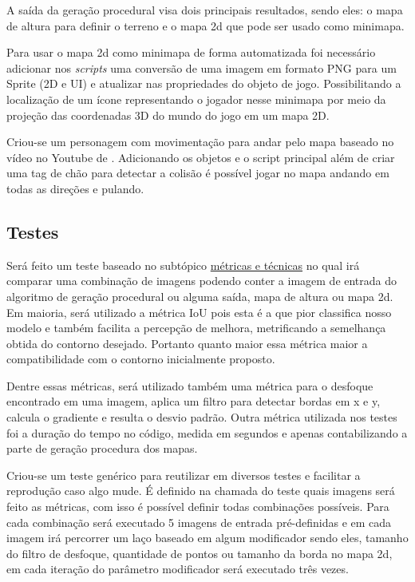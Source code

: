 A saída da geração procedural visa dois principais resultados, sendo eles: o mapa de altura para definir o terreno e o mapa 2d que pode ser usado como minimapa.

Para usar o mapa 2d como minimapa de forma automatizada foi necessário adicionar nos \textit{scripts} uma conversão de uma imagem em formato PNG para um Sprite (2D e UI) e atualizar nas propriedades do objeto de jogo. Possibilitando a localização de um ícone representando o jogador nesse minimapa por meio da projeção das coordenadas 3D do mundo do jogo em um mapa 2D.


Criou-se um personagem com movimentação para andar pelo mapa baseado no vídeo no Youtube de . Adicionando os objetos e o script principal além de criar uma tag de chão para detectar a colisão é possível jogar no mapa andando em todas as direções e pulando.
\subsection{Testes}

Será feito um teste baseado no subtópico \hyperref[sec:metricas_tecnicas]{métricas e técnicas} no qual irá comparar uma combinação de imagens podendo conter a imagem de entrada do algoritmo de geração procedural ou alguma saída, mapa de altura ou mapa 2d. Em maioria, será utilizado a métrica IoU pois esta é a que pior classifica nosso modelo e também facilita a percepção de melhora, metrificando a semelhança obtida do contorno desejado. Portanto quanto maior essa métrica maior a compatibilidade com o contorno inicialmente proposto.

Dentre essas métricas, será utilizado também uma métrica para o desfoque encontrado em uma imagem, aplica um filtro para detectar bordas em x e y, calcula o gradiente e resulta o desvio padrão. Outra métrica utilizada nos testes foi a duração do tempo no código, medida em segundos e apenas contabilizando a parte de geração procedura dos mapas.

Criou-se um teste genérico para reutilizar em diversos testes e facilitar a reprodução caso algo mude. É definido na chamada do teste quais imagens será feito as métricas, com isso é possível definir todas combinações possíveis. Para cada combinação será executado 5 imagens de entrada pré-definidas e em cada imagem irá percorrer um laço baseado em algum modificador sendo eles, tamanho do filtro de desfoque, quantidade de pontos ou tamanho da borda no mapa 2d, em cada iteração do parâmetro modificador será executado três vezes.


